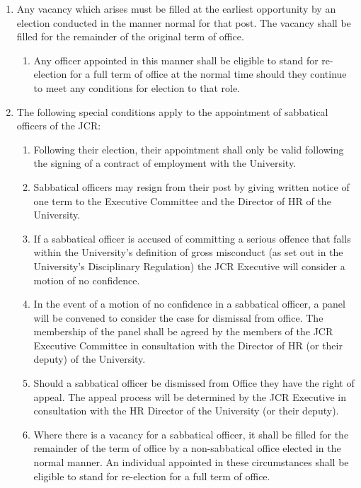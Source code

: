 \documentclass[12pt]{article}  %
\begin{document}
\begin{enumerate}
\begin{enumerate}
    \end{enumerate}
    \item Any vacancy which arises must be filled at the earliest opportunity by an election conducted in the manner normal for that post. The vacancy shall be filled for the remainder of the original term of office.
    \begin{enumerate}
        \item Any officer appointed in this manner shall be eligible to stand for re-election for a full term of office at the normal time should they continue to meet any conditions for election to that role.
    \end{enumerate}
    \item The following special conditions apply to the appointment of sabbatical officers of the JCR:
    \begin{enumerate}
        \item Following their election, their appointment shall only be valid following the signing of a contract of employment with the University.
        \item Sabbatical officers may resign from their post by giving written notice of one term to the Executive Committee and the Director of HR of the University.
        \item If a sabbatical officer is accused of committing a serious offence that falls within the University’s definition of gross misconduct (as set out in the University’s Disciplinary Regulation) the JCR Executive will consider a motion of no confidence.
        \item In the event of a motion of no confidence in a sabbatical officer, a panel will be convened to consider the case for dismissal from office. The membership of the panel shall be agreed by the members of the JCR Executive Committee in consultation with the Director of HR (or their deputy) of the University.
        \item Should a sabbatical officer be dismissed from Office they have the right of appeal. The appeal process will be determined by the JCR Executive in consultation with the HR Director of the University (or their deputy).
        \item Where there is a vacancy for a sabbatical officer, it shall be filled for the remainder of the term of office by a non-sabbatical office elected in the normal manner. An individual appointed in these circumstances shall be eligible to stand for re-election for a full term of office.
    \end{enumerate}

\end{enumerate}
\end{document}
